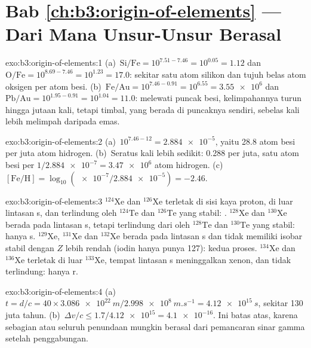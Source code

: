 \section*{Bab \ref{ch:b3:origin-of-elements} --- Dari Mana Unsur-Unsur Berasal}

\begin{solution}{exo:b3:origin-of-elements:1}
(a)~$\mathrm{Si/Fe} = 10^{7.51 - 7.46} = 10^{0.05} = 1.12$ dan
$\mathrm{O/Fe} = 10^{8.69 - 7.46} = 10^{1.23} = 17.0$: sekitar satu atom silikon
dan tujuh belas atom oksigen per atom besi. (b)~$\mathrm{Fe/Au} =
10^{7.46 - 0.91} = 10^{6.55} = \num{3.55e6}$ dan $\mathrm{Pb/Au} =
10^{1.95 - 0.91} = 10^{1.04} = 11.0$: melewati puncak besi, kelimpahannya
turun hingga jutaan kali, tetapi timbal, yang berada di puncaknya sendiri, sebelas kali lebih melimpah
daripada emas.
\end{solution}

\begin{solution}{exo:b3:origin-of-elements:2}
(a)~$10^{7.46 - 12} = \num{2.884e-5}$, yaitu \num{28.8} atom besi per
juta atom hidrogen. (b)~Seratus kali lebih sedikit: \num{0.288} per
juta, satu atom besi per $1/\num{2.884e-7} = \num{3.47e6}$ atom
hidrogen. (c)~$[\mathrm{Fe/H}] = \log_{10}(\num{e-7}/\num{2.884e-5}) =
-2.46$.
\end{solution}

\begin{solution}{exo:b3:origin-of-elements:3}
$^{124}\mathrm{Xe}$ dan $^{126}\mathrm{Xe}$ terletak di sisi kaya proton,
di luar lintasan s, dan terlindung oleh $^{124}\mathrm{Te}$ dan
$^{126}\mathrm{Te}$ yang stabil: . $^{128}\mathrm{Xe}$ dan $^{130}\mathrm{Xe}$
berada pada lintasan s, tetapi terlindung dari  oleh
$^{128}\mathrm{Te}$ dan $^{130}\mathrm{Te}$ yang stabil: hanya s. $^{129}\mathrm{Xe}$,
$^{131}\mathrm{Xe}$ dan $^{132}\mathrm{Xe}$ berada pada lintasan s dan tidak memiliki
isobar stabil dengan $Z$ lebih rendah (iodin hanya punya 127): kedua proses.
$^{134}\mathrm{Xe}$ dan $^{136}\mathrm{Xe}$ terletak di luar
$^{133}\mathrm{Xe}$, tempat lintasan s meninggalkan xenon, dan tidak
terlindung: hanya r.
\end{solution}

\begin{solution}{exo:b3:origin-of-elements:4}
(a)~$t = d/c = 40\times\qty{3.086e22}{m}/\qty{2.998e8}{m.s^{-1}} =
\qty{4.12e15}{s}$, sekitar \num{130} juta tahun. (b)~$\Delta v/c \le
1.7/\num{4.12e15} = \num{4.1e-16}$. Ini batas atas, karena sebagian
atau seluruh penundaan mungkin berasal dari pemancaran sinar gamma setelah
penggabungan.
\end{solution}

